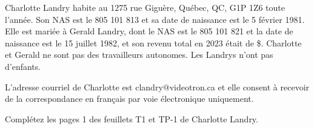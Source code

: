 Charlotte Landry habite au 1275 rue Giguère, Québec, QC, G1P 1Z6 toute l’année. Son NAS est le 805 101 813 et sa date de naissance est le 5 février 1981. Elle est mariée à Gerald Landry, dont le NAS est le 805 101 821 et la date de naissance est le 15 juillet 1982, et son revenu total en 2023 était de  \$. Charlotte et Gerald ne sont pas des travailleurs autonomes. Les Landrys n’ont pas d’enfants.

L’adresse courriel de Charlotte est clandry@videotron.ca et elle consent à recevoir de la correspondance en français par voie électronique uniquement.

Complétez les pages 1 des feuillets T1 et TP-1 de Charlotte Landry.
